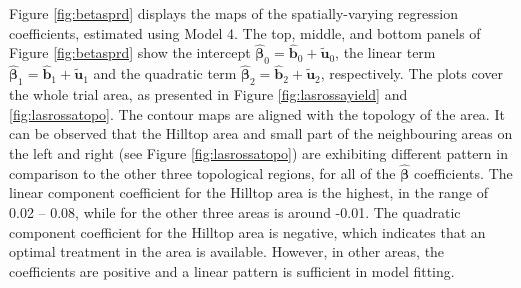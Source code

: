 \documentclass[a4paper]{article}   	%
\begin{document}
	Figure \ref{fig:betasprd} displays the maps of the spatially-varying regression coefficients, estimated using Model 4. The top, middle, and bottom panels of Figure \ref{fig:betasprd} show the intercept $\hat{\bm{\beta}}_0 = \hat{\bm{b}}_0+\tilde{\bm{u}}_0$, the linear term $\hat{\bm{\beta}}_1 = \hat{\bm{b}}_1+\tilde{\bm{u}}_1$ and the quadratic term $\hat{\bm{\beta}}_2 = \hat{\bm{b}}_2+\tilde{\bm{u}}_2$, respectively. The plots cover the whole trial area, as presented in Figure \ref{fig:lasrossayield} and \ref{fig:lasrossatopo}. 
	The contour maps are aligned with the topology of the area. It can be observed that the Hilltop area and small part of the neighbouring areas on the left and right (see Figure \ref{fig:lasrossatopo}) are exhibiting different pattern in comparison to the other three topological regions, for all of the $\hat{\bm{\beta}}$ coefficients. The linear component coefficient for the Hilltop area is the highest, in the range of 0.02 -- 0.08, while for the other three areas is around -0.01. %
	The quadratic component coefficient for the Hilltop area is negative, which indicates that an optimal treatment in the area is available. However, in other areas, the coefficients are positive and a linear pattern is sufficient in model fitting. 
	
	
\end{document}

